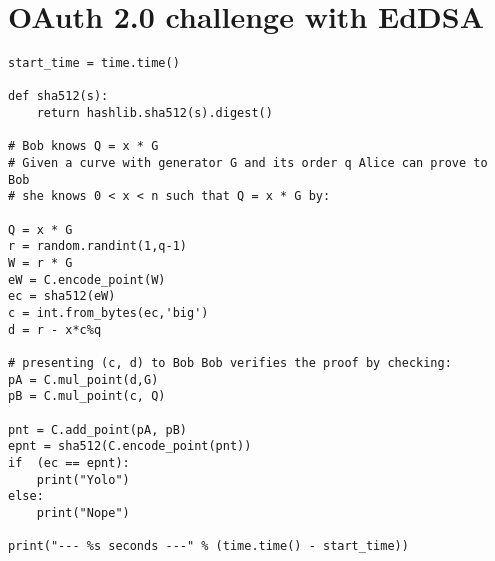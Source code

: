 \section*{OAuth 2.0 challenge with EdDSA}

\begin{lstlisting}
start_time = time.time()

def sha512(s):
    return hashlib.sha512(s).digest()
    
# Bob knows Q = x * G
# Given a curve with generator G and its order q Alice can prove to Bob
# she knows 0 < x < n such that Q = x * G by: 

Q = x * G
r = random.randint(1,q-1) 
W = r * G
eW = C.encode_point(W)
ec = sha512(eW)
c = int.from_bytes(ec,'big')
d = r - x*c%q 

# presenting (c, d) to Bob Bob verifies the proof by checking:
pA = C.mul_point(d,G)
pB = C.mul_point(c, Q)

pnt = C.add_point(pA, pB)
epnt = sha512(C.encode_point(pnt))
if  (ec == epnt):
    print("Yolo")
else:
    print("Nope")
    
print("--- %s seconds ---" % (time.time() - start_time))

\end{lstlisting}